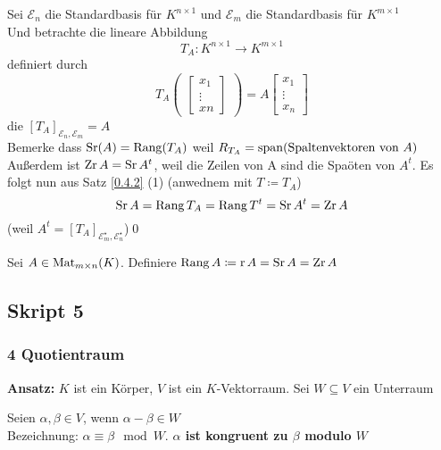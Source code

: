 \begin{subproof*}
	Sei $ \mathcal{E}_n  $ die Standardbasis für $ K^{n \times 1}  $ und $ \mathcal{E} _m $ die Standardbasis für $ K^{m \times 1}  $\\
	Und betrachte die lineare Abbildung
	\[
		T_A : K^{n \times 1} \to K^{m \times 1} 
	\]
	definiert durch
	\[
		T_A \begin{pmatrix} \begin{bmatrix} x_1\\ \vdots \\ xn \end{bmatrix}  \end{pmatrix} = A \begin{bmatrix} x_1 \\ \vdots \\ x_n \end{bmatrix} 
	\]
	die $ \left[ T_A \right]_{\mathcal{E} _n, \mathcal{E} _m} = A $\\
	Bemerke dass $ \operatorname{Sr} (A) = \operatorname{Rang} (T_A) $ weil $ R_{T_A} = \operatorname{span} (\text{Spaltenvektoren von $ A $} ) $\\
	Außerdem ist $ \operatorname{Zr} A = \operatorname{Sr} A^t $, weil die Zeilen von A sind die Spaöten von $ A^t $.
	Es folgt nun aus Satz \ref{0.4.2} (1) (anwednem mit $ T \coloneqq T_A $)
	\[
		\operatorname{Sr} A = \operatorname{Rang} T_A = \operatorname{Rang} T^t = \operatorname{Sr} A^t = \operatorname{Zr} A
	\]
	(weil $ A^t = \left[ T_A \right]_{\mathcal{E} _m^\star , \mathcal{E} _n^\star }  $)\qed
\end{subproof*}

\begin{subdefinition}
	Sei $ A \in \operatorname{Mat}_{m \times n} (K) $. Definiere $ \operatorname{Rang} A \coloneqq \operatorname{r} A = \operatorname{Sr} A = \operatorname{Zr} A $ 
\end{subdefinition}

\subsection{Skript 5}
\subsubsection{4 Quotientraum}
\textbf{Ansatz:} $ K $ ist ein Körper, $ V $ ist ein $ K $-Vektorraum. Sei $ W \subseteq V $ ein Unterraum

\begin{subdefinition}
	Seien $ \alpha, \beta \in V $, wenn $ \alpha - \beta \in W $\\
	Bezeichnung: $ \alpha \equiv \beta \mod W $. \textbf{$ \alpha $ ist kongruent zu $ \beta $ modulo $ W $}
\end{subdefinition}

